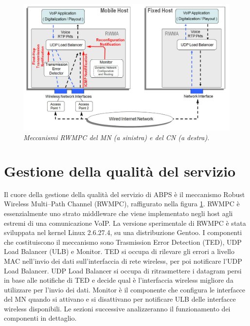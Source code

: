 \documentclass[12pt,a4paper,openright,twoside]{book}
\begin{document}
\begin{figure}
  \centering
  \includegraphics[width=\textwidth]{img/rwma}
  \caption{\em Meccanismi RWMPC del MN (a sinistra) e del CN (a
    destra).}
  \label{fig:abps:rwmpc}
\end{figure}

\section{Gestione della qualità del servizio}

Il cuore della gestione della qualità del servizio di ABPS è il
meccanismo Robust Wireless Multi--Path Channel (RWMPC), raffigurato
nella figura \ref{fig:abps:rwmpc}. RWMPC è essenzialmente uno strato
middleware che viene implementato negli host agli estremi di una
comunicazione VoIP. La versione sperimentale di RWMPC è stata
sviluppata nel kernel Linux 2.6.27.4, su una distribuzione Gentoo. I
componenti che costituiscono il meccanismo sono Trasmission Error
Detection (TED), UDP Load Balancer (ULB) e Monitor. TED si occupa di
rilevare gli errori a livello MAC nell'invio dei dati sull'interfaccia
di rete wireless, per poi notificare l'UDP Load Balancer. UDP Load
Balancer si occupa di ritrasmettere i datagram persi in base alle
notifiche di TED e decide qual è l'interfaccia wireless migliore da
utilizzare per l'invio dei dati. Monitor è il componente che configura
le interfacce del MN quando si attivano e si disattivano per
notificare ULB delle interfacce wireless disponibili. Le sezioni
successive analizzeranno il funzionamento dei componenti in dettaglio.
\end{document}
